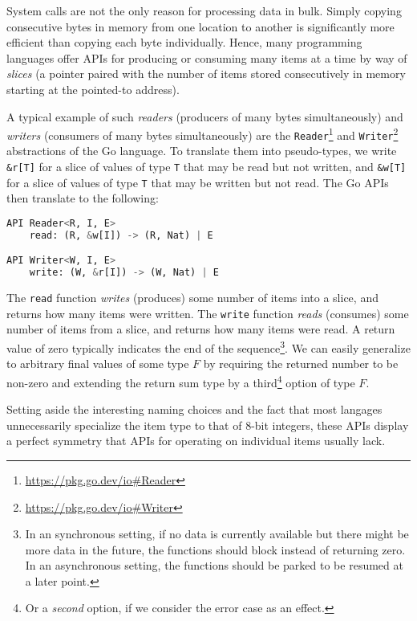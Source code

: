 \documentclass[sigplan,screen,10pt,anonymous,review]{acmart}
\begin{document}
System calls are not the only reason for processing data in bulk. Simply copying consecutive bytes in memory from one location to another is significantly more efficient than copying each byte individually. Hence, many programming languages offer APIs for producing or consuming many items at a time by way of \textit{slices} (a pointer paired with the number of items stored consecutively in memory starting at the pointed-to address).

A typical example of such \textit{readers} (producers of many bytes simultaneously) and \textit{writers} (consumers of many bytes simultaneously) are the \texttt{Reader}\footnote{\url{https://pkg.go.dev/io\#Reader}} and \texttt{Writer}\footnote{\url{https://pkg.go.dev/io\#Writer}} abstractions of the Go language. To translate them into pseudo-types, we write \texttt{\&r[T]} for a slice of values of type \texttt{T} that may be read but not written, and \texttt{\&w[T]} for a slice of values of type \texttt{T} that may be written but not read. The Go APIs then translate to the following:

\begin{lstlisting}[language=Python]
API Reader<R, I, E>
    read: (R, &w[I]) -> (R, Nat) | E

API Writer<W, I, E>
    write: (W, &r[I]) -> (W, Nat) | E
\end{lstlisting}

The \texttt{read} function \textit{writes} (produces) some number of items into a slice, and returns how many items were written. The \texttt{write} function \textit{reads} (consumes) some number of items from a slice, and returns how many items were read. A return value of zero typically indicates the end of the sequence\footnote{In an synchronous setting, if no data is currently available but there might be more data in the future, the functions should block instead of returning zero. In an asynchronous setting, the functions should be parked to be resumed at a later point.}. We can easily generalize to arbitrary final values of some type $F$ by requiring the returned number to be non-zero and extending the return sum type by a third\footnote{Or a \textit{second} option, if we consider the error case as an effect.} option of type $F$.

Setting aside the interesting naming choices and the fact that most langages unnecessarily specialize the item type to that of 8-bit integers, these APIs display a perfect symmetry that APIs for operating on individual items usually lack.
\end{document}

